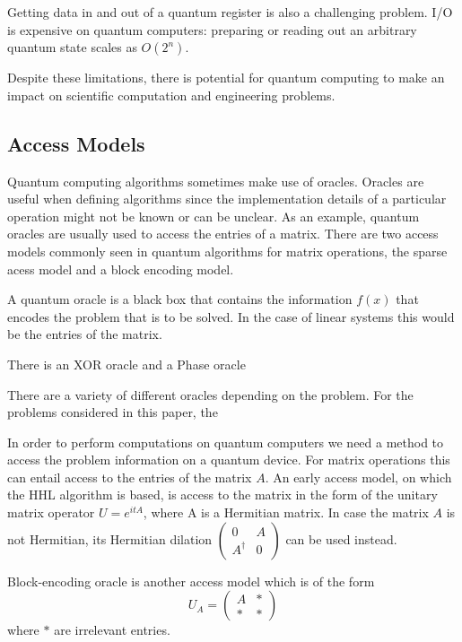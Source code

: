 \documentclass{article}
\begin{document}
Getting data in and out of a quantum register is also a challenging problem. I/O is expensive on quantum computers: preparing or reading out an arbitrary quantum state scales as $O(2^n)$.

Despite these limitations, there is potential for quantum computing to make an impact on scientific computation and engineering problems.


\subsection{Access Models}

Quantum computing algorithms sometimes make use of oracles. Oracles are useful when defining algorithms since the implementation details of a particular operation might not be known or can be unclear. As an example, quantum oracles are usually used to access the entries of a matrix. There are two access models commonly seen in quantum algorithms for matrix operations, the sparse acess model and a block encoding model.

A quantum oracle is a black box that contains the information $f(x)$ that encodes the problem that is to be solved. In the case of linear systems this would be the entries of the matrix.

There is an XOR oracle and a Phase oracle

There are a variety of different oracles depending on the problem. For the problems considered in this paper, the 

In order to perform computations on quantum computers we need a method to access the problem information on a quantum device. For matrix operations this can entail access to the entries of the matrix $A$. An early access model, on which the HHL algorithm is based, is access to the matrix in the form of the unitary matrix operator $U=e^{itA}$, where A is a Hermitian matrix. In case the matrix $A$ is not Hermitian, its Hermitian dilation 
$\begin{pmatrix}
0 & A \\ A^\dagger & 0
\end{pmatrix} $ 
can be used instead. 

Block-encoding oracle is another access model which is of the form
\begin{equation}
U_A =
\begin{pmatrix}
 A & * \\ * & *
\end{pmatrix}
\end{equation}
where $*$ are irrelevant entries.
\end{document}
